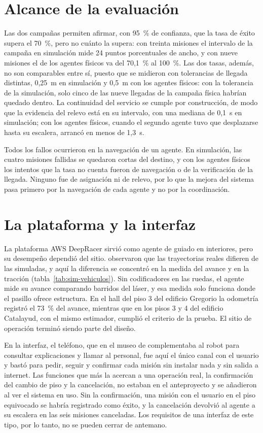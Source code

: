 \section{Alcance de la evaluación}

Las dos campañas permiten afirmar, con 95~\% de confianza, que la tasa de éxito supera el 70~\%, pero no cuánto la supera: con treinta misiones el intervalo de la campaña en simulación mide 24 puntos porcentuales de ancho, y con nueve misiones el de los agentes físicos va del 70,1~\% al 100~\%. Las dos tasas, además, no son comparables entre sí, puesto que se midieron con tolerancias de llegada distintas, 0,25~m en simulación y 0,5~m con los agentes físicos: con la tolerancia de la simulación, solo cinco de las nueve llegadas de la campaña física habrían quedado dentro. La continuidad del servicio se cumple por construcción, de modo que la evidencia del relevo está en su intervalo, con una mediana de 0,1~s en simulación; con los agentes físicos, cuando el segundo agente tuvo que desplazarse hasta su escalera, arrancó en menos de 1,3~s.

Todos los fallos ocurrieron en la navegación de un agente. En simulación, las cuatro misiones fallidas se quedaron cortas del destino, y con los agentes físicos los intentos que la tasa no cuenta fueron de navegación o de la verificación de la llegada. Ninguno fue de asignación ni de relevo, por lo que la mejora del sistema pasa primero por la navegación de cada agente y no por la coordinación.

\section{La plataforma y la interfaz}

La plataforma AWS DeepRacer sirvió como agente de guiado en interiores, pero su desempeño dependió del sitio. \textcite{rudrusamy2022broadcast} observaron que las trayectorias reales difieren de las simuladas, y aquí la diferencia se concentró en la medida del avance y en la tracción (tabla~\ref{tab:sim-vehiculos}). Sin codificadores en las ruedas, el agente mide su avance comparando barridos del láser, y esa medida solo funciona donde el pasillo ofrece estructura. En el hall del piso 3 del edificio Gregorio la odometría registró el 73~\% del avance, mientras que en los pisos 3 y 4 del edificio Catalayud, con el mismo estimador, cumplió el criterio de la prueba. El sitio de operación terminó siendo parte del diseño.

En la interfaz, el teléfono, que en el museo de \textcite{kayukawa2023enhancing} complementaba al robot para consultar explicaciones y llamar al personal, fue aquí el único canal con el usuario y bastó para pedir, seguir y confirmar cada misión sin instalar nada y sin salida a internet. Las funciones que más la acercan a una operación real, la confirmación del cambio de piso y la cancelación, no estaban en el anteproyecto y se añadieron al ver el sistema en uso. Sin la confirmación, una misión con el usuario en el piso equivocado se habría registrado como éxito, y la cancelación devolvió al agente a su escalera en las seis misiones canceladas. Los requisitos de una interfaz de este tipo, por lo tanto, no se pueden cerrar de antemano.

